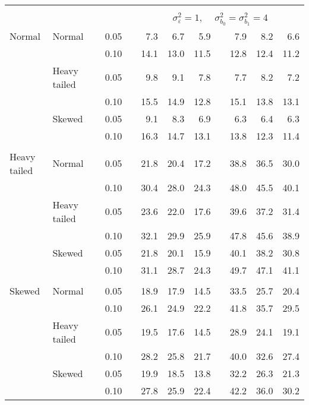 \begin{table}[ht]
\begin{scriptsize}
\begin{tabular}{ll p{.1cm} c p{.1cm} rrr p{.1cm} rrr}
&&&&&&&&&&&\\
& && && \multicolumn{7}{c}{$\sigma_{\varepsilon}^2 = 1$, \ \ $\sigma_{b_0}^2 = \sigma_{b_1}^2 = 4$} \\ \cline{6-12}
\rowcolor{gray!20} Normal & Normal &  & 0.05 &  & 7.3 & 6.7 & 5.9 &  & 7.9 & 8.2 & 6.6 \\ 
\rowcolor{gray!20}    &  &  & 0.10 &  & 14.1 & 13.0 & 11.5 &  & 12.8 & 12.4 & 11.2 \\ 
\rowcolor{gray!20}    & Heavy tailed &  & 0.05 &  & 9.8 & 9.1 & 7.8 &  & 7.7 & 8.2 & 7.2 \\ 
\rowcolor{gray!20}    &  &  & 0.10 &  & 15.5 & 14.9 & 12.8 &  & 15.1 & 13.8 & 13.1 \\ 
\rowcolor{gray!20}    & Skewed &  & 0.05 &  & 9.1 & 8.3 & 6.9 &  & 6.3 & 6.4 & 6.3 \\ 
\rowcolor{gray!20}    &  &  & 0.10 &  & 16.3 & 14.7 & 13.1 &  & 13.8 & 12.3 & 11.4 \\ 
&&&&&&&&&&&\\
  Heavy tailed & Normal &  & 0.05 &  & 21.8 & 20.4 & 17.2 &  & 38.8 & 36.5 & 30.0 \\ 
   &  &  & 0.10 &  & 30.4 & 28.0 & 24.3 &  & 48.0 & 45.5 & 40.1 \\ 
   & Heavy tailed &  & 0.05 &  & 23.6 & 22.0 & 17.6 &  & 39.6 & 37.2 & 31.4 \\ 
   &  &  & 0.10 &  & 32.1 & 29.9 & 25.9 &  & 47.8 & 45.6 & 38.9 \\ 
   & Skewed &  & 0.05 &  & 21.8 & 20.1 & 15.9 &  & 40.1 & 38.2 & 30.8 \\ 
   &  &  & 0.10 &  & 31.1 & 28.7 & 24.3 &  & 49.7 & 47.1 & 41.1 \\ 
&&&&&&&&&&&\\
  Skewed & Normal &  & 0.05 &  & 18.9 & 17.9 & 14.5 &  & 33.5 & 25.7 & 20.4 \\ 
   &  &  & 0.10 &  & 26.1 & 24.9 & 22.2 &  & 41.8 & 35.7 & 29.5 \\ 
   & Heavy tailed &  & 0.05 &  & 19.5 & 17.6 & 14.5 &  & 28.9 & 24.1 & 19.1 \\ 
   &  &  & 0.10 &  & 28.2 & 25.8 & 21.7 &  & 40.0 & 32.6 & 27.4 \\ 
   & Skewed &  & 0.05 &  & 19.9 & 18.5 & 13.8 &  & 32.2 & 26.3 & 21.3 \\ 
   &  &  & 0.10 &  & 27.8 & 25.9 & 22.4 &  & 42.2 & 36.0 & 30.2 \\ 


\hline
\end{tabular}
\end{scriptsize}
\end{table}


